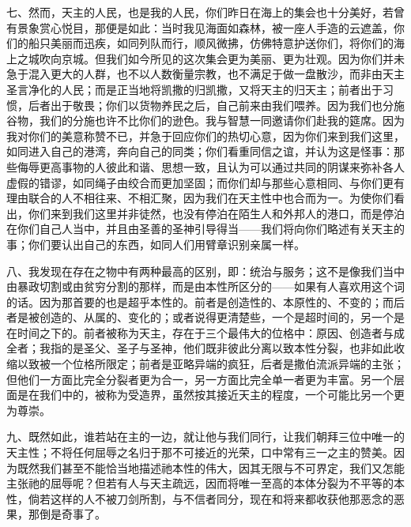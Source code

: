 七、然而，天主的人民，也是我的人民，你们昨日在海上的集会也十分美好，若曾有景象赏心悦目，那便是如此：当时我见海面如森林，被一座人手造的云遮盖，你们的船只美丽而迅疾，如同列队而行，顺风微拂，仿佛特意护送你们，将你们的海上之城吹向京城。但我们如今所见的这次集会更为美丽、更为壮观。因为你们并未急于混入更大的人群，也不以人数衡量宗教，也不满足于做一盘散沙，而非由天主圣言净化的人民；而是正当地将凯撒的归凯撒，又将天主的归天主；前者出于习惯，后者出于敬畏；你们以货物养民之后，自己前来由我们喂养。因为我们也分施谷物，我们的分施也许不比你们的逊色。我与智慧一同邀请你们赴我的筵席。因为我对你们的美意称赞不已，并急于回应你们的热切心意，因为你们来到我们这里，如同进入自己的港湾，奔向自己的同类；你们看重同信之谊，并认为这是怪事：那些侮辱更高事物的人彼此和谐、思想一致，且认为可以通过共同的阴谋来弥补各人虚假的错谬，如同绳子由绞合而更加坚固；而你们却与那些心意相同、与你们更有理由联合的人不相往来、不相汇聚，因为我们在天主性中也合而为一。为使你们看出，你们来到我们这里并非徒然，也没有停泊在陌生人和外邦人的港口，而是停泊在你们自己人当中，并且由圣善的圣神引导得当——我们将向你们略述有关天主的事；你们要认出自己的东西，如同人们用臂章识别亲属一样。\par

八、我发现在存在之物中有两种最高的区别，即：统治与服务；这不是像我们当中由暴政切割或由贫穷分割的那样，而是由本性所区分的——如果有人喜欢用这个词的话。因为那首要的也是超乎本性的。前者是创造性的、本原性的、不变的；而后者是被创造的、从属的、变化的；或者说得更清楚些，一个是超时间的，另一个是在时间之下的。前者被称为天主，存在于三个最伟大的位格中：原因、创造者与成全者；我指的是圣父、圣子与圣神，他们既非彼此分离以致本性分裂，也非如此收缩以致被一个位格所限定；前者是亚略异端的疯狂，后者是撒伯流派异端的主张；但他们一方面比完全分裂者更为合一，另一方面比完全单一者更为丰富。另一个层面是在我们中的，被称为受造界，虽然按其接近天主的程度，一个可能比另一个更为尊崇。\par

九、既然如此，谁若站在主的一边，就让他与我们同行，让我们朝拜三位中唯一的天主性；不将任何屈辱之名归于那不可接近的光荣，口中常有三一之主的赞美。因为既然我们甚至不能恰当地描述祂本性的伟大，因其无限与不可界定，我们又怎能主张祂的屈辱呢？但若有人与天主疏远，因而将唯一至高的本体分裂为不平等的本性，倘若这样的人不被刀剑所割，与不信者同分，现在和将来都收获他那恶念的恶果，那倒是奇事了。\par


